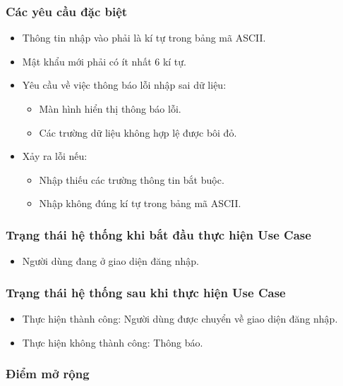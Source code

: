 \subsubsection{Các yêu cầu đặc biệt}
\begin{itemize}
    \item Thông tin nhập vào phải là kí tự trong bảng mã ASCII.
    \item Mật khẩu mới phải có ít nhất 6 kí tự.
    \item Yêu cầu về việc thông báo lỗi nhập sai dữ liệu:
    \begin{itemize}
        \item Màn hình hiển thị thông báo lỗi.
        \item Các trường dữ liệu không hợp lệ được bôi đỏ.
    \end{itemize}
    \item Xảy ra lỗi nếu:
    \begin{itemize}
        \item Nhập thiếu các trường thông tin bắt buộc.
        \item Nhập không đúng kí tự trong bảng mã ASCII.
    \end{itemize}
\end{itemize}

\subsubsection{Trạng thái hệ thống khi bắt đầu thực hiện Use Case}
\begin{itemize}
    \item Người dùng đang ở giao diện đăng nhập.
\end{itemize}

\subsubsection{Trạng thái hệ thống sau khi thực hiện Use Case}
\begin{itemize}
    \item Thực hiện thành công: Người dùng được chuyển về giao diện đăng nhập.
    \item Thực hiện không thành công: Thông báo.
\end{itemize}

\subsubsection{Điểm mở rộng}